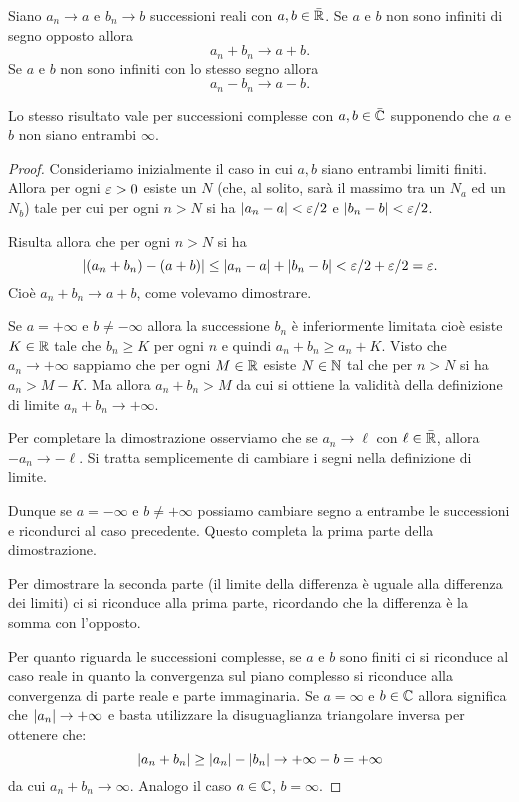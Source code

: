 \begin{theorem}
\label{th:limite_somma}%
\mymark{***}%
%
Siano $a_n \to a$ e $b_n \to b$ successioni reali con $a,b\in \bar {\mathbb R}$.
Se $a$ e $b$ non sono
infiniti di segno opposto
allora
\[
    a_n + b_n \to a+b.
\]
Se $a$ e $b$ non sono infiniti con lo stesso segno allora
\[
   a_n - b_n \to a-b.
\]

Lo stesso risultato vale per successioni complesse con $a,b\in \bar {\mathbb C}$
supponendo che $a$ e $b$ non siano entrambi $\infty$.
\end{theorem}
%
\begin{proof}
\mymark{**}
Consideriamo inizialmente il caso in cui $a,b$ siano entrambi limiti finiti.
Allora per ogni $\varepsilon>0$ esiste un $N$ (che, al solito, sarà il massimo tra un $N_a$ ed un $N_b$) tale per cui per ogni $n> N$ si ha
${\left|a_n -a\right|} < \varepsilon/2$ e ${\left|b_n - b\right|} < \varepsilon/2$.

Risulta allora che per ogni $n> N$ si ha
\[
  {\left|(a_n + b_n) - (a+b)\right|} \le {\left|a_n -a\right|} + {\left|b_n -b\right|} < \varepsilon/2 + \varepsilon/2 = \varepsilon.
\]
Cioè $a_n+b_n \to a+b$, come volevamo dimostrare.

Se $a =+\infty$ e $b\neq -\infty$ allora la successione $b_n$ è inferiormente
limitata cioè esiste $K\in \mathbb R$ tale che $b_n \ge K$ per ogni $n$ e quindi
$a_n+b_n \ge a_n + K$.
Visto che $a_n \to +\infty$ sappiamo che per ogni $M\in \mathbb R$ esiste
$N\in \mathbb N$ tal che per $n>N$ si ha $a_n > M - K$.
Ma allora $a_n + b_n >M$ da cui si ottiene la validità della definizione
di limite $a_n + b_n \to +\infty$.

Per completare la dimostrazione osserviamo che se $a_n\to \ell$ con $\ell \in
\bar {\mathbb R}$, allora $-a_n \to -\ell$. Si tratta semplicemente di cambiare i segni
nella definizione di limite.

Dunque se $a=-\infty$ e $b\neq +\infty$ possiamo cambiare segno a entrambe
le successioni e ricondurci al caso precedente. Questo completa la prima
parte della dimostrazione.

Per dimostrare la seconda parte (il limite della differenza è uguale alla differenza dei limiti) ci si riconduce alla prima parte, ricordando che la
differenza è la somma con l'opposto.

Per quanto riguarda le successioni complesse, se $a$ e $b$ sono finiti ci si
riconduce al caso reale in quanto la convergenza sul piano complesso si riconduce
alla convergenza di parte reale e parte immaginaria.
Se $a=\infty$ e $b\in \mathbb C$ allora significa che ${\left|a_n\right|}\to +\infty$ e
basta
utilizzare la disuguaglianza triangolare inversa per ottenere che:
\[
  {\left|a_n+b_n\right|} \ge {\left|a_n\right|} - {\left|b_n\right|} \to +\infty - b = +\infty
\]
da cui $a_n+b_n\to \infty$. Analogo il caso $a\in \mathbb C$, $b=\infty$.
\end{proof}

